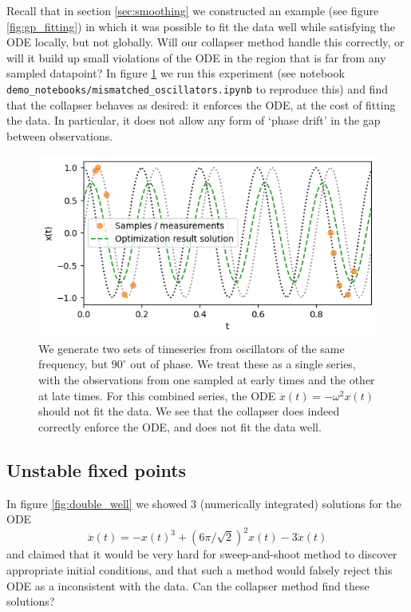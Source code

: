 \documentclass{article}
\begin{document}
Recall that in section \ref{sec:smoothing} we constructed an example (see figure \ref{fig:gp_fitting}) in which it was possible to fit the data well while satisfying the ODE locally, but not globally.
Will our collapser method handle this correctly, or will it build up small violations of the ODE in the region that is far from any sampled datapoint?
In figure \ref{fig:mismatched_oscillators} we run this experiment (see notebook \texttt{demo\_notebooks/mismatched\_oscillators.ipynb} to reproduce this) and find that the collapser behaves as desired: it enforces the ODE, at the cost of fitting the data.
In particular, it does not allow any form of `phase drift' in the gap between observations.

\begin{figure}
\includegraphics{images/results/mismatched_oscillators.png}
\centering
\caption{
We generate two sets of timeseries from oscillators of the same frequency, but $90^{\circ}$ out of phase.
We treat these as a single series, with the observations from one sampled at early times and the other at late times.
For this combined series, the ODE $\ddot{x}(t) = - \omega^2 x(t)$ should not fit the data.
We see that the collapser does indeed correctly enforce the ODE, and does not fit the data well.
}
\label{fig:mismatched_oscillators}
\end{figure}

\subsection{Unstable fixed points}
\label{sec:unstable_fixed_points}

In figure \ref{fig:double_well} we showed 3 (numerically integrated) solutions for the ODE
$$
\ddot{x}(t) = - x(t)^3 + (6\pi/\sqrt{2})^2 x(t) - 3 \dot{x}(t)
$$
and claimed that it would be very hard for sweep-and-shoot method to discover appropriate initial conditions, and that such a method would falsely reject this ODE as a inconsistent with the data.
Can the collapser method find these solutions?
\end{document}
